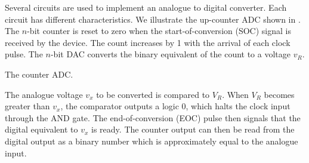 \begin{slide}\label{slide:compare}
\begin{center}
\end{center}
\end{slide}

Several circuits are used to implement an analogue to digital
converter. Each circuit has different characteristics. We illustrate
the up-counter ADC shown in . The $n$-bit counter is
reset to zero when the start-of-conversion (SOC) signal is received by
the device. The count increases by 1 with the arrival of each clock
pulse. The $n$-bit DAC converts the binary equivalent of the count to
a voltage $v_R$.

\begin{slide}\label{slide:ADC}
The counter ADC.
\begin{center}
\end{center}
\end{slide}

The analogue voltage $v_x$ to be converted is compared to $V_R$. When
$V_R$ becomes greater than $v_x$, the comparator outputs a logic 0,
which halts the clock input through the AND gate. The
end-of-conversion (EOC) pulse then signals that the digital equivalent
to $v_x$ is ready. The counter output can then be read from the
digital output as a binary number which is approximately equal to the
analogue input.


